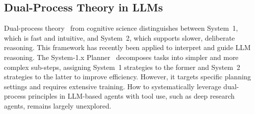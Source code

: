 

\subsection{Dual-Process Theory in LLMs}


Dual-process theory~\cite{chaiken1999dual} from cognitive science distinguishes between System~1, which is fast and intuitive, and System~2, which supports slower, deliberate reasoning.
This framework has recently been applied to interpret and guide LLM reasoning.
The System-1.x Planner~\cite{saha2024system} decomposes tasks into simpler and more complex sub-steps, assigning System~1 strategies to the former and System~2 strategies to the latter to improve efficiency.
However, it targets specific planning settings and requires extensive training.
How to systematically leverage dual-process principles in LLM-based agents with tool use, such as deep research agents, remains largely unexplored.



